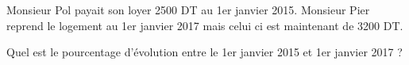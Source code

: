 
Monsieur Pol payait son loyer 2500 DT au 1er janvier 2015. Monsieur Pier reprend le logement au 1er janvier 2017 mais celui ci est maintenant de 3200 DT.

  Quel est le pourcentage d'évolution entre le 1er janvier 2015 et 1er janvier 2017 ? 
 
 